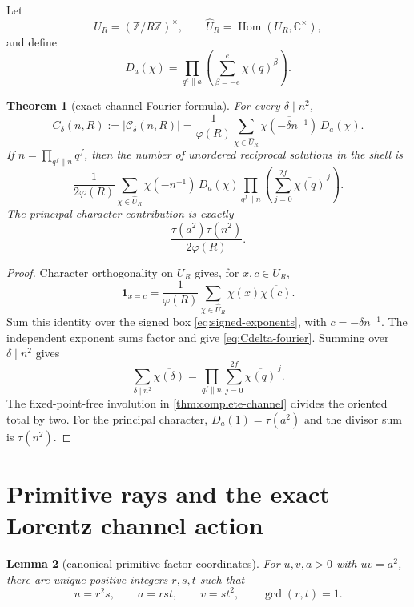 \documentclass[11pt]{article}
\newtheorem{theorem}{Theorem}[section]
\newtheorem{lemma}[theorem]{Lemma}
\theoremstyle{definition}
\theoremstyle{remark}
\newcommand{\Z}{\mathbb Z}
\newcommand{\C}{\mathbb C}
\newcommand{\1}{\mathbf 1}
\begin{document}
Let
\[
 U_R=(\Z/R\Z)^\times,
 \qquad \widehat U_R=\operatorname{Hom}(U_R,\C^\times),
\]
and define
\begin{equation}\label{eq:Dchi}
 D_a(\chi)=
 \prod_{q^e\parallel a}\left(\sum_{\beta=-e}^{e}\chi(q)^\beta\right).
\end{equation}

\begin{theorem}[exact channel Fourier formula]\label{thm:fourier}
For every $\delta\mid n^2$,
\begin{equation}\label{eq:Cdelta-fourier}
 C_\delta(n,R):=|\mathscr C_\delta(n,R)|
 =\frac1{\varphi(R)}
 \sum_{\chi\in\widehat U_R}
 \overline{\chi(-\delta n^{-1})}\,D_a(\chi).
\end{equation}
If $n=\prod_{q^f\parallel n}q^f$, then the number of unordered reciprocal
solutions in the shell is
\begin{equation}\label{eq:total-fourier}
 \boxed{
 \frac1{2\varphi(R)}
 \sum_{\chi\in\widehat U_R}
 \overline{\chi(-n^{-1})}\,D_a(\chi)
 \prod_{q^f\parallel n}
 \left(\sum_{j=0}^{2f}\overline{\chi(q)}^{\,j}\right).}
\end{equation}
The principal-character contribution is exactly
\begin{equation}\label{eq:principal-term}
 \frac{\tau(a^2)\tau(n^2)}{2\varphi(R)}.
\end{equation}
\end{theorem}

\begin{proof}
Character orthogonality on $U_R$ gives, for $x,c\in U_R$,
\[
 \1_{x=c}=\frac1{\varphi(R)}
 \sum_{\chi\in\widehat U_R}\chi(x)\overline{\chi(c)}.
\]
Sum this identity over the signed box \eqref{eq:signed-exponents}, with
$c=-\delta n^{-1}$.  The independent exponent sums factor and give
\eqref{eq:Cdelta-fourier}.  Summing over $\delta\mid n^2$ gives
\[
 \sum_{\delta\mid n^2}\overline{\chi(\delta)}
 =\prod_{q^f\parallel n}\sum_{j=0}^{2f}\overline{\chi(q)}^{\,j}.
\]
The fixed-point-free involution in \cref{thm:complete-channel} divides the
oriented total by two.  For the principal character,
$D_a(1)=\tau(a^2)$ and the divisor sum is $\tau(n^2)$.
\end{proof}

\section{Primitive rays and the exact Lorentz channel action}

\begin{lemma}[canonical primitive factor coordinates]\label{lem:factor-ray}
For $u,v,a>0$ with $uv=a^2$, there are unique positive integers $r,s,t$ such
that
\begin{equation}\label{eq:rst}
 u=r^2s,\qquad a=rst,\qquad v=st^2,
 \qquad \gcd(r,t)=1.
\end{equation}
\end{lemma}
\end{document}
